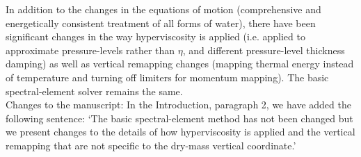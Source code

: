 \documentclass[11pt]{article}
\begin{document}
In addition to the  changes in the equations of motion (comprehensive and energetically consistent treatment of all forms of water), there have been significant changes in the way hyperviscosity is applied (i.e. applied to approximate pressure-levels rather than $\eta$, and different pressure-level thickness damping) as well as vertical remapping changes (mapping thermal energy instead of temperature and turning off limiters for momentum mapping). The basic spectral-element solver remains the same.\\

Changes to the manuscript: In the Introduction, paragraph 2, we have added the following sentence: `The basic spectral-element method has not been changed but we present changes to the details of how hyperviscosity is applied and the vertical remapping that are not specific to the dry-mass vertical coordinate.' 
\end{document}

